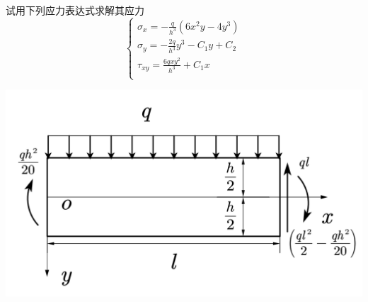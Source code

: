 \begin{example}
	试用下列应力表达式求解其应力\[\begin{cases}
	\sigma _x=-\frac{q}{h^3}\left( 6x^2y-4y^3 \right)\\
	\sigma _y=-\frac{2q}{h^3}y^3-C_1y+C_2\\
	\tau _{xy}=\frac{6qxy^2}{h^3}+C_1x\\
	\end{cases}\]
\end{example}
\centerline{\includegraphics[scale=0.5]{figure/2-13.png}}
